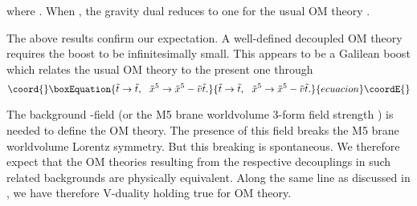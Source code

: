 \documentclass[a4paper,12pt]{article}
\begin{document}
where \coordHE{}.
When \coordHE{}, the gravity dual reduces to one for the usual
OM theory \cite{Harm}.

	The above results confirm our expectation. A well-defined
decoupled OM theory requires the boost \coordHE{}
to be infinitesimally small. This appears to be a Galilean boost which 
relates the usual OM theory to the present one through
\begin{equation}\coord{}\boxEquation{
\tilde t \to \tilde t, \ \ \tilde x^5 \to \tilde x^5 - \tilde v 
\tilde t.
\label{eq:gb}
}{
\tilde t \to \tilde t, \ \ \tilde x^5 \to \tilde x^5 - \tilde v 
\tilde t.
}{ecuacion}\coordE{}\end{equation}

The background \coordHE{}-field (or the M5 brane worldvolume 3-form field
strength \coordHE{}) is needed to define the OM theory. The presence of this
field breaks the M5 brane worldvolume Lorentz symmetry. But this
breaking is spontaneous. We therefore expect that the OM theories resulting 
from the respective decouplings in such related backgrounds 
are physically equivalent. Along the same line as discussed in
\cite{CLW}, we have therefore V-duality holding true for OM theory.
\end{document}
